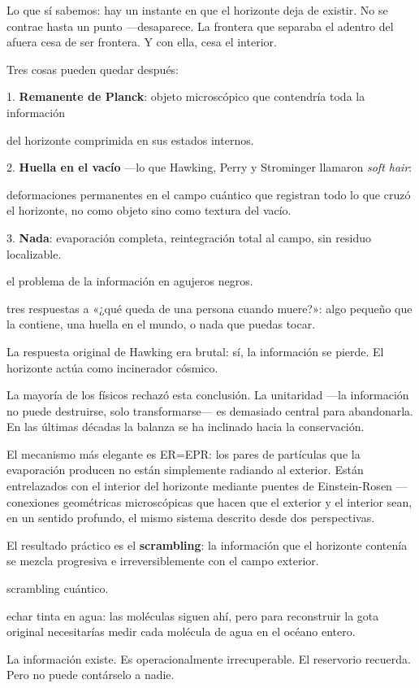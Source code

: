 Lo que sí sabemos: hay un instante en que el horizonte deja de existir. No se contrae hasta un punto —desaparece. La frontera que separaba el adentro del afuera cesa de ser frontera. Y con ella, cesa el interior.

Tres cosas pueden quedar después:

1. \textbf{Remanente de Planck}: objeto microscópico que contendría toda la información

del horizonte comprimida en sus estados internos.

2. \textbf{Huella en el vacío} —lo que Hawking, Perry y Strominger llamaron \emph{soft hair}:

deformaciones permanentes en el campo cuántico que registran todo lo que cruzó el horizonte, no como objeto sino como textura del vacío.

3. \textbf{Nada}: evaporación completa, reintegración total al campo, sin residuo localizable.

\begin{fisica}
 el problema de la información en agujeros negros.

 tres respuestas a «¿qué queda de una persona cuando muere?»: algo pequeño que la contiene, una huella en el mundo, o nada que puedas tocar.
\end{fisica}
\noindent La respuesta original de Hawking era brutal: sí, la información se pierde. El horizonte actúa como incinerador cósmico.

La mayoría de los físicos rechazó esta conclusión. La unitaridad —la información no puede destruirse, solo transformarse— es demasiado central para abandonarla. En las últimas décadas la balanza se ha inclinado hacia la conservación.

El mecanismo más elegante es ER=EPR: los pares de partículas que la evaporación producen no están simplemente radiando al exterior. Están entrelazados con el interior del horizonte mediante puentes de Einstein-Rosen —conexiones geométricas microscópicas que hacen que el exterior y el interior sean, en un sentido profundo, el mismo sistema descrito desde dos perspectivas.

El resultado práctico es el \textbf{scrambling}: la información que el horizonte contenía se mezcla progresiva e irreversiblemente con el campo exterior.

\begin{fisica}
 scrambling cuántico.

 echar tinta en agua: las moléculas siguen ahí, pero para reconstruir la gota original necesitarías medir cada molécula de agua en el océano entero.
\end{fisica}
La información existe. Es operacionalmente irrecuperable. El reservorio recuerda. Pero no puede contárselo a nadie.

